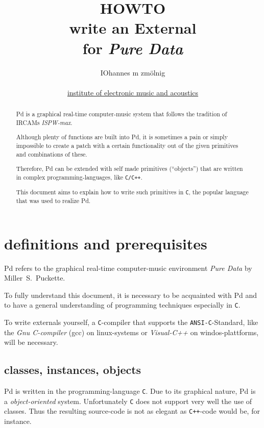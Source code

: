 \documentclass[12pt, a4paper,english,titlepage]{article}
\title{
HOWTO \\
write an External \\
for {\em Pure Data}
}
\author{
IOhannes m zmölnig \\
\\
\href{http://iem.at/}{institute of electronic music and acoustics}
}
\begin{document}
\maketitle

\begin{abstract}
Pd is a graphical real-time computer-music  system that follows the tradition of
IRCAMs {\em ISPW-max}.

Although plenty of functions are built into Pd,
it is sometimes a pain or simply impossible to create a patch with a certain
functionality out of the given primitives and combinations of these.

Therefore, Pd can be extended with self made primitives (``objects'')
that are written in complex programming-languages, like {\tt C/C++}. 

This document aims to explain how to write such primitives in {\tt C},
the popular language that was used to realize Pd.


\end{abstract}


\vfill
\newpage

\tableofcontents

\vfill
\newpage

\section{definitions and prerequisites}
Pd refers to the graphical real-time computer-music environment {\em Pure Data}
by Miller~S.~Puckette.

To fully understand this document, it is necessary to
be acquainted with Pd and to 
have a general understanding of programming techniques especially in {\tt C}.

To write externals yourself, a {\tt C}-compiler that supports the
{\tt ANSI-C}-Standard, like the {\em Gnu C-compiler} (gcc) on linux-systems or
{\em Visual-C++} on windos-plattforms, will be necessary.

\subsection{classes, instances, objects}
Pd is written in the programming-language {\tt C}.
Due to its graphical nature, Pd is a {\em object-oriented} system.
Unfortunately {\tt C} does not support very well the use of classes.
Thus the resulting source-code is not as elegant as {\tt C++}-code would be, for instance.
\end{document}
